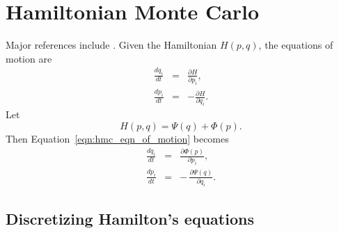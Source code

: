 
\section{Hamiltonian Monte Carlo}
Major references include \cite{Duane1987,Neal1993,Neal1996,Neal2012}.
Given the Hamiltonian $H(p,q)$, the equations of motion are
\begin{eqnarray}
\label{eqn:hmc_eqn_of_motion}
\frac{dq_i}{dt} &=& \frac{\partial H}{\partial p_i}, \\
\frac{dp_i}{dt} &=& -\frac{\partial H}{\partial q_i}.
\end{eqnarray}
Let
\begin{equation}
H(p,q) = \Psi(q) + \Phi(p).
\end{equation}
Then Equation~\ref{eqn:hmc_eqn_of_motion} becomes
\begin{eqnarray}
\label{eqn:hmc_deriv_psi_phi}
\frac{dq_i}{dt} &=&  \frac{\partial \Phi(p)}{\partial p_i}, \\
\frac{dp_i}{dt} &=& -\,\frac{\partial \Psi(q)}{\partial q_i}.
\end{eqnarray}

\subsection{Discretizing Hamilton's equations}

